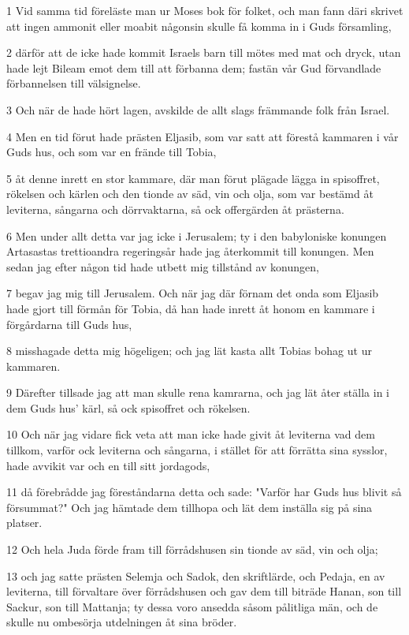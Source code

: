 \par 1 Vid samma tid föreläste man ur Moses bok för folket, och man fann däri skrivet att ingen ammonit eller moabit någonsin skulle få komma in i Guds församling,
\par 2 därför att de icke hade kommit Israels barn till mötes med mat och dryck, utan hade lejt Bileam emot dem till att förbanna dem; fastän vår Gud förvandlade förbannelsen till välsignelse.
\par 3 Och när de hade hört lagen, avskilde de allt slags främmande folk från Israel.
\par 4 Men en tid förut hade prästen Eljasib, som var satt att förestå kammaren i vår Guds hus, och som var en frände till Tobia,
\par 5 åt denne inrett en stor kammare, där man förut plägade lägga in spisoffret, rökelsen och kärlen och den tionde av säd, vin och olja, som var bestämd åt leviterna, sångarna och dörrvaktarna, så ock offergärden åt prästerna.
\par 6 Men under allt detta var jag icke i Jerusalem; ty i den babyloniske konungen Artasastas trettioandra regeringsår hade jag återkommit till konungen. Men sedan jag efter någon tid hade utbett mig tillstånd av konungen,
\par 7 begav jag mig till Jerusalem. Och när jag där förnam det onda som Eljasib hade gjort till förmån för Tobia, då han hade inrett åt honom en kammare i förgårdarna till Guds hus,
\par 8 misshagade detta mig högeligen; och jag lät kasta allt Tobias bohag ut ur kammaren.
\par 9 Därefter tillsade jag att man skulle rena kamrarna, och jag lät åter ställa in i dem Guds hus' kärl, så ock spisoffret och rökelsen.
\par 10 Och när jag vidare fick veta att man icke hade givit åt leviterna vad dem tillkom, varför ock leviterna och sångarna, i stället för att förrätta sina sysslor, hade avvikit var och en till sitt jordagods,
\par 11 då förebrådde jag föreståndarna detta och sade: "Varför har Guds hus blivit så försummat?" Och jag hämtade dem tillhopa och lät dem inställa sig på sina platser.
\par 12 Och hela Juda förde fram till förrådshusen sin tionde av säd, vin och olja;
\par 13 och jag satte prästen Selemja och Sadok, den skriftlärde, och Pedaja, en av leviterna, till förvaltare över förrådshusen och gav dem till biträde Hanan, son till Sackur, son till Mattanja; ty dessa voro ansedda såsom pålitliga män, och de skulle nu ombesörja utdelningen åt sina bröder.

